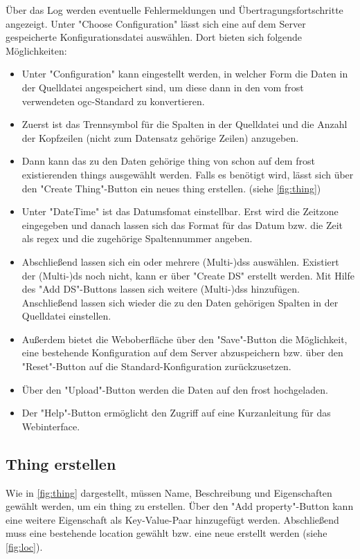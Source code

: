 \documentclass[a4paper, 12 pt]{article}
\begin{document}
Über das Log werden eventuelle Fehlermeldungen und Übertragungsfortschritte angezeigt. Unter "{Choose Configuration}" lässt sich eine auf dem Server gespeicherte Konfigurationsdatei auswählen. Dort bieten sich folgende Möglichkeiten:
\begin{itemize}
\item Unter "{Configuration}" kann eingestellt werden, in welcher Form die Daten in der Quelldatei angespeichert sind, um diese dann in den vom \gls{frost} verwendeten \gls{ogc}-Standard zu konvertieren.
\item Zuerst ist das Trennsymbol für die Spalten in der Quelldatei und die Anzahl der Kopfzeilen (nicht zum Datensatz gehörige Zeilen) anzugeben. 
\item Dann kann das zu den Daten gehörige \gls{thing} von schon auf dem \gls{frost} existierenden \glspl{thing} ausgewählt werden. Falls es benötigt wird, lässt sich über den "{Create Thing}"{-Button} ein neues \gls{thing} erstellen. (siehe \cref{fig:thing})
\item Unter "{DateTime}"{ ist} das Datumsfomat einstellbar. Erst wird die Zeitzone eingegeben und danach lassen sich das Format für das Datum bzw. die Zeit als \gls{regex} und die zugehörige Spaltennummer angeben.
\item Abschließend lassen sich ein oder mehrere (Multi-)\glspl{ds} auswählen. Existiert der (Multi-)\gls{ds} noch nicht, kann er über "{Create DS}"{ erstellt} werden. Mit Hilfe des "{Add DS}"{-Buttons} lassen sich weitere (Multi-)\glspl{ds} hinzufügen. Anschließend lassen sich wieder die zu den Daten gehörigen Spalten in der Quelldatei einstellen.
\item Außerdem bietet die Weboberfläche über den "{Save}"{-Button} die Möglichkeit, eine bestehende Konfiguration auf dem Server abzuspeichern bzw. über den "{Reset}"{-Button} auf die Standard-Konfiguration zurückzusetzen.
\item Über den "{Upload}"{-Button} werden die Daten auf den \gls{frost} hochgeladen.
\item Der "{Help}"{-Button} ermöglicht den Zugriff auf eine Kurzanleitung für das Webinterface.
\end{itemize}

\subsection{Thing erstellen}
Wie in \cref{fig:thing} dargestellt, müssen Name, Beschreibung und Eigenschaften gewählt werden, um ein \gls{thing} zu erstellen. Über den "{Add property}"{-Button} kann eine weitere Eigenschaft als Key-Value-Paar hinzugefügt werden. Abschließend muss eine bestehende \gls{location} gewählt bzw. eine neue erstellt werden (siehe \cref{fig:loc}).
\end{document}
